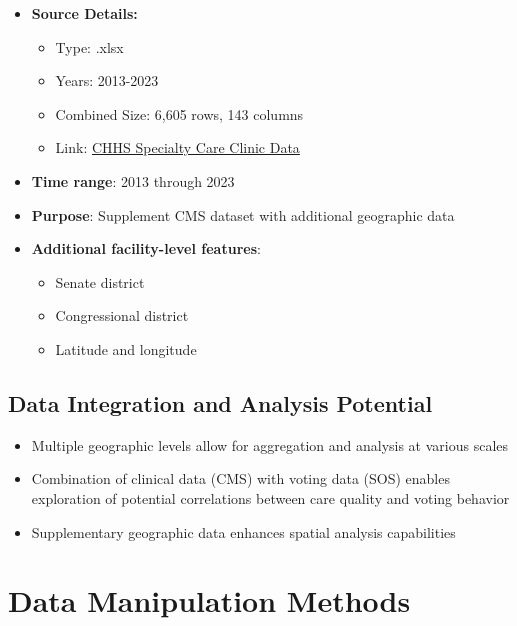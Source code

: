 \documentclass[
  11pt,
  letterpaper,
  DIV=11,
  numbers=noendperiod]{scrartcl}
\providecommand{\tightlist}{%
  \setlength{\itemsep}{0pt}\setlength{\parskip}{0pt}}\usepackage{longtable,booktabs,array}
\begin{document}
\begin{itemize}
\tightlist
\item
  \textbf{Source Details:}

  \begin{itemize}
  \tightlist
  \item
    Type: .xlsx
  \item
    Years: 2013-2023
  \item
    Combined Size: 6,605 rows, 143 columns
  \item
    Link:
    \href{https://data.chhs.ca.gov/dataset/specialty-care-clinic-complete-data-set}{CHHS
    Specialty Care Clinic Data}
  \end{itemize}
\item
  \textbf{Time range}: 2013 through 2023
\item
  \textbf{Purpose}: Supplement CMS dataset with additional geographic
  data
\item
  \textbf{Additional facility-level features}:

  \begin{itemize}
  \tightlist
  \item
    Senate district
  \item
    Congressional district
  \item
    Latitude and longitude
  \end{itemize}
\end{itemize}

\subsection{Data Integration and Analysis
Potential}\label{data-integration-and-analysis-potential}

\begin{itemize}
\tightlist
\item
  Multiple geographic levels allow for aggregation and analysis at
  various scales
\item
  Combination of clinical data (CMS) with voting data (SOS) enables
  exploration of potential correlations between care quality and voting
  behavior
\item
  Supplementary geographic data enhances spatial analysis capabilities
\end{itemize}

\section{Data Manipulation Methods}\label{data-manipulation-methods}
\end{document}
